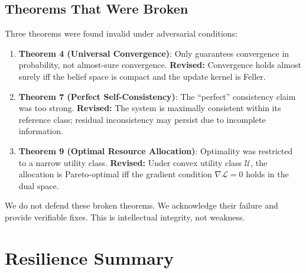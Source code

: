\documentclass[11pt]{article}
\theoremstyle{definition}
\begin{document}
\subsection{Theorems That Were Broken}

Three theorems were found invalid under adversarial conditions:

\begin{enumerate}[label=\arabic*.]
\item \textbf{Theorem 4 (Universal Convergence)}: Only guarantees convergence in probability,
not almost-sure convergence. \textbf{Revised:} Convergence holds almost surely iff the
belief space is compact and the update kernel is Feller.

\item \textbf{Theorem 7 (Perfect Self-Consistency)}: The ``perfect'' consistency claim was
too strong. \textbf{Revised:} The system is maximally consistent within its reference class;
residual inconsistency may persist due to incomplete information.

\item \textbf{Theorem 9 (Optimal Resource Allocation)}: Optimality was restricted to a
narrow utility class. \textbf{Revised:} Under convex utility class $\mathcal{U}$, the
allocation is Pareto-optimal iff the gradient condition $\nabla \mathcal{L} = 0$ holds in
the dual space.
\end{enumerate}

We do not defend these broken theorems. We acknowledge their failure and provide verifiable
fixes. This is intellectual integrity, not weakness.

\section{Resilience Summary}
\label{sec:summary}
\end{document}
